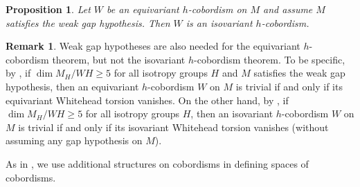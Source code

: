 \documentclass[11pt]{amsart}
\newtheorem{prop}{Proposition}[section]
\theoremstyle{definition}
\newtheorem{rem}{Remark}[section]
\numberwithin{equation}{section}
\numberwithin{figure}{section}
\begin{document}
\begin{prop}\label{eqisiso}\cite[Theorem 4.51.]{luck}
Let $W$ be an equivariant $h$-cobordism on $M$ and assume $M$ satisfies the weak gap hypothesis. Then $W$ is an isovariant $h$-cobordism.
\end{prop}

\begin{rem}
Weak gap hypotheses are also needed for the equivariant $h$-cobordism theorem, but not the isovariant $h$-cobordism theorem. To be specific, by \cite[Theorem 4.42]{luck}, if $\dim M_H / WH \geq 5$ for all isotropy groups $H$ and $M$ satisfies the weak gap hypothesis, then an equivariant $h$-cobordism $W$ on $M$ is trivial if and only if its equivariant Whitehead torsion vanishes. On the other hand, by \cite[Theorem 5.51]{luck}, if $\dim M_H / WH \geq 5$ for all isotropy groups $H$, then an isovariant $h$-cobordism $W$ on $M$ is trivial if and only if its isovariant Whitehead torsion vanishes (without assuming any gap hypothesis on $M$).
\end{rem}


As in \cite[Definition 4.2]{GIMM1}, we use additional structures on cobordisms in defining spaces of cobordisms.
\end{document}

